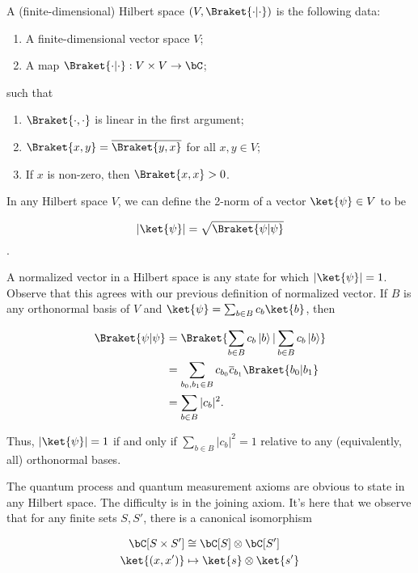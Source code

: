 \begin{defn} A (finite-dimensional) Hilbert space $(V,\Braket{\cdot | \cdot})$ is the following data:

\begin{enumerate}
\item A finite-dimensional vector space $V$;
\item A map $\Braket{\cdot | \cdot}:V\times V\to \bC$;
\end{enumerate}

such that

\begin{enumerate}
\item $\Braket{\cdot,\cdot}$ is linear in the first argument;
\item $\Braket{x,y}=\overline{\Braket{y,x}}$ for all $x,y\in V$;
\item If $x$ is non-zero, then $\Braket{x,x}>0$.
\end{enumerate}

\raggedleft\qedsymbol{}
\end{defn}

In any Hilbert space $V$, we can define the 2-norm of a vector $\ket{\psi}\in V$ to be

$$|\ket{\psi}|=\sqrt{\Braket{\psi | \psi}}$$.

A normalized vector in a Hilbert space is any state for which $|\ket{\psi}|=1$. Observe that this agrees with our previous definition of normalized vector. If $B$ is any orthonormal basis of $V$ and $\ket{\psi}=\sum_{b\in B}c_b \ket{b}$, then

\begin{align*}
\Braket{\psi|\psi}&=\Braket{\sum_{b\in B}c_b\left|b\right>|\sum_{b\in B}c_b \left|b\right>}\\
&=\sum_{b_0,b_1\in B}c_{b_0}\overline{c}_{b_1}\Braket{b_0 | b_1}\\
&=\sum_{b\in B} |c_b|^2.
\end{align*}

Thus, $|\ket{\psi}|=1$ if and only if $\sum_{b\in B} |c_b|^2=1$ relative to any (equivalently, all) orthonormal bases.

The quantum process and quantum measurement axioms are obvious to state in any Hilbert space. The difficulty is in the joining axiom. It's here that we observe that for any finite sets $S,S'$, there is a canonical isomorphism

\begin{align*}
\bC[S\times S']&\cong \bC[S]\otimes \bC[S']\\
\ket{(x,x')}&\mapsto \ket{s}\otimes \ket{s'}
\end{align*}

